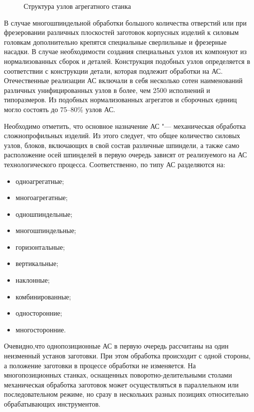 \begin{figure}[ht]
	\caption{Структура узлов агрегатного станка}\label{fig:agr-machine}
\end{figure}

В случае многошпиндельной обработки большого количества отверстий или при фрезеровании различных плоскостей заготовок корпусных изделий к силовым головкам дополнительно крепятся специальные сверлильные и фрезерные насадки. В случае необходимости создания специальных узлов их компонуют из нормализованных сборок и деталей. Конструкция подобных узлов определяется в соответствии с конструкции детали, которая подлежит обработки на АС. Отечественные реализации АС включали в себя несколько сотен наименований различных унифицированных узлов в более, чем 2500 исполнений и типоразмеров. Из подобных нормализованных агрегатов и сборочных единиц могло состоять до 75--80\% узлов АС.

Необходимо отметить, что основное назначение АС "--- механическая обработка сложнопрофильных изделий. Из этого следует, что общее количество силовых узлов, блоков, включающих в свой состав различные шпиндели, а также само расположение осей шпинделей в первую очередь зависят от реализуемого на АС технологического процесса. Соответственно, по типу АС разделяются на: 

\begin{itemize}
	\item одноагрегатные;
	\item многоагрегатные;
	\item одношпиндельные;
	\item многошпиндельные;
	\item горизонтальные;
	\item вертикальные;
	\item наклонные;
	\item комбинированные;
	\item односторонние;
	\item многосторонние.
\end{itemize}

Очевидно,что однопозиционные АС в первую очередь рассчитаны на один неизменный установ заготовки. При этом обработка происходит с одной стороны, а положение заготовки в процессе обработки не изменяется. На многопозиционных станках, оснащенных поворотно-делительными столами механическая обработка заготовок может осуществляться в параллельном или последовательном режиме, но сразу в нескольких разных позициях относительно обрабатывающих инструментов.

